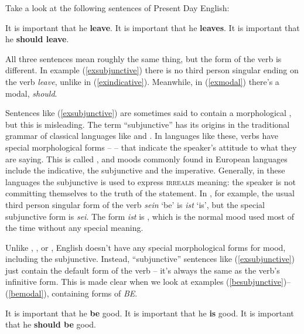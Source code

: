 Take a look at the following sentences of Present Day English:

\begin{exe}
\ex It is important that he \textbf{leave}.\label{exsubjunctive}
\ex It is important that he \textbf{leaves}.\label{exindicative}
\ex It is important that he \textbf{should leave}.\label{exmodal}
\end{exe}

\noindent All three sentences mean roughly the same thing, but the form of the verb is different. In example (\ref{exsubjunctive}) there is no third person singular ending on the verb \textit{leave}, unlike in (\ref{exindicative}). Meanwhile, in (\ref{exmodal}) there's a modal, \textit{should}.

Sentences like (\ref{exsubjunctive}) are sometimes said to contain a morphological , but this is misleading. The term ``subjunctive'' has its origins in the traditional grammar of classical languages like  and . In languages like these, verbs have special morphological forms --  -- that indicate the speaker's attitude to what they are saying. This is called , and moods commonly found in European languages include the indicative, the subjunctive and the imperative. Generally, in these languages the subjunctive is used to express \textsc{irrealis} meaning: the speaker is not committing themselves to the truth of the statement. In , for example, the usual third person singular form of the verb \textit{sein} `be' is \textit{ist} `is', but the special subjunctive form is \textit{sei}. The form \textit{ist} is , which is the normal mood used most of the time without any special meaning.

Unlike , ,  or , English doesn't have any special morphological forms for mood, including the subjunctive. Instead, ``subjunctive'' sentences like (\ref{exsubjunctive}) just contain the default form of the verb -- it's always the same as the verb's infinitive form. This is made clear when we look at examples (\ref{besubjunctive})--(\ref{bemodal}), containing forms of \emph{BE}.

\begin{exe}
\ex It is important that he \textbf{be} good.\label{besubjunctive}
\ex It is important that he \textbf{is} good.\label{beindicative}
\ex It is important that he \textbf{should be} good.\label{bemodal}
\end{exe}

